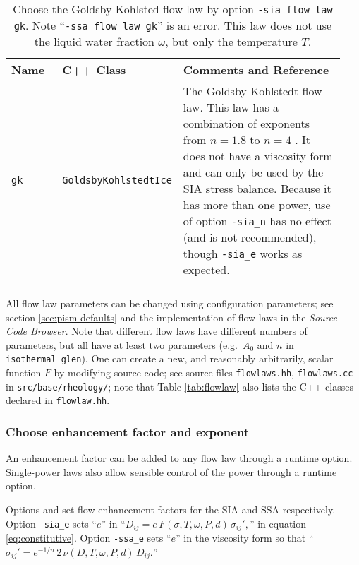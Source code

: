 \begin{table}[ht]
\centering
\bigskip
{}
\small
\begin{tabular}{p{0.16\linewidth}p{0.2\linewidth}p{0.58\linewidth}}\toprule
\textbf{Name} & C++ Class & \textbf{Comments and Reference} \\ \midrule
\texttt{gk} & \texttt{GoldsbyKohlstedtIce} & The  Goldsby-Kohlstedt flow law.  This law has a combination of exponents  from $n=1.8$ to $n=4$ \cite{GoldsbyKohlstedt}. It does not have a viscosity form and can only be used by the SIA stress balance.  Because it has more than one power, use of option \texttt{-sia_n} has no effect (and is not recommended), though \texttt{-sia_e} works as expected. \\
\bottomrule
\normalsize	
\end{tabular}
\caption{Choose the Goldsby-Kohlsted flow law by option \texttt{-sia_flow_law gk}.  Note ``\texttt{-ssa_flow_law gk}'' is an error.  This law does not use the liquid water fraction $\omega$, but only the temperature $T$.}
\label{tab:flowlawgk}
\end{table}

All flow law parameters can be changed using configuration parameters; see section \ref{sec:pism-defaults} and the implementation of flow laws in the \emph{Source Code Browser}.  Note that different flow laws have different numbers of parameters, but all have at least two parameters (e.g.~$A_0$ and $n$ in \texttt{isothermal_glen}).  One can create a new, and reasonably arbitrarily, scalar function $F$ by modifying source code; see source files \texttt{flowlaws.hh}, \texttt{flowlaws.cc} in \texttt{src/base/rheology/}; note that Table \ref{tab:flowlaw} also lists the C++ classes declared in \texttt{flowlaw.hh}.

\subsubsection*{Choose enhancement factor and exponent}  An enhancement factor can be added to any flow law through a runtime option.  Single-power laws also allow sensible control of the power through a runtime option.

Options  and  set flow enhancement factors for the SIA and SSA respectively.  Option \texttt{-sia_e} sets ``$e$'' in ``$D_{ij} = e\, F(\sigma,T,\omega,P,d)\, \sigma_{ij}',$'' in equation \eqref{eq:constitutive}.  Option \texttt{-ssa_e} sets ``$e$'' in the viscosity form so that ``$\sigma_{ij}'  = e^{-1/n}\, 2\, \nu(D,T,\omega,P,d)\, D_{ij}.$''

